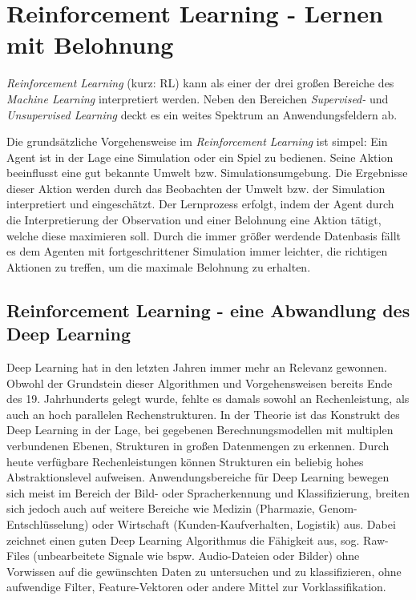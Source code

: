 
\chapter{Reinforcement Learning - Lernen mit Belohnung}
\label{chap:rl}
%

	\textit{Reinforcement Learning} (kurz: RL) kann als einer der drei großen Bereiche des \textit{Machine Learning} interpretiert werden. Neben den Bereichen \textit{Supervised-} und  \textit{Unsupervised Learning} deckt es ein weites Spektrum an Anwendungsfeldern ab.
	
	Die grundsätzliche Vorgehensweise im \textit{Reinforcement Learning} ist simpel: Ein Agent ist in der Lage eine Simulation oder ein Spiel zu bedienen. Seine Aktion beeinflusst eine gut bekannte Umwelt bzw. Simulationsumgebung. Die Ergebnisse dieser Aktion werden durch das Beobachten der Umwelt bzw. der Simulation interpretiert und eingeschätzt. Der Lernprozess erfolgt, indem der Agent durch die Interpretierung der Observation und einer Belohnung eine Aktion tätigt, welche diese maximieren soll. Durch die immer größer werdende Datenbasis fällt es dem Agenten mit fortgeschrittener Simulation immer leichter, die \glqq richtigen\grqq{} Aktionen zu treffen, um die maximale Belohnung zu erhalten.
	

\section{Reinforcement Learning - eine Abwandlung des Deep Learning}
\label{sec:rl_dl}
	Deep Learning hat in den letzten Jahren immer mehr an Relevanz gewonnen. Obwohl der Grundstein dieser Algorithmen und Vorgehensweisen bereits Ende des 19. Jahrhunderts gelegt wurde, fehlte es damals sowohl an Rechenleistung, als auch an hoch parallelen Rechenstrukturen. In der Theorie ist das Konstrukt des Deep Learning in der Lage, bei gegebenen Berechnungsmodellen mit multiplen verbundenen Ebenen, Strukturen in großen Datenmengen zu erkennen. Durch heute verfügbare Rechenleistungen können Strukturen ein beliebig hohes Abstraktionslevel aufweisen. Anwendungsbereiche für Deep Learning bewegen sich meist im Bereich der Bild- oder Spracherkennung und Klassifizierung, breiten sich jedoch auch auf weitere Bereiche wie Medizin (Pharmazie, Genom-Entschlüsselung) oder Wirtschaft (Kunden-Kaufverhalten, Logistik) aus. Dabei zeichnet einen guten Deep Learning Algorithmus die Fähigkeit aus, sog. Raw-Files (unbearbeitete Signale wie bspw. Audio-Dateien oder Bilder) ohne Vorwissen auf die gewünschten Daten zu untersuchen und zu klassifizieren, ohne aufwendige Filter, Feature-Vektoren oder andere Mittel zur Vorklassifikation.
	
